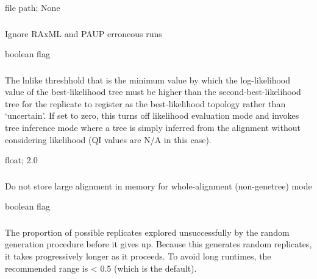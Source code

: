 \documentclass[letterpaper,12pt,english]{sphinxmanual}
\begin{document}
 file path;  None


\subsubsection{}
\label{\detokenize{prog_desc:ignore-errors}}
 Ignore RAxML and PAUP erroneous runs

 boolean flag


\subsubsection{}
\label{\detokenize{prog_desc:lnlike-lnlike-thresh}}
 The lnlike threshhold that is the minimum value by which the log-likelihood value of the best-likelihood tree must be higher than the second-best-likelihood tree for the replicate to register as the best-likelihood topology rather than ‘uncertain’. If set to zero, this turns off likelihood evaluation mode and invokes tree inference mode where a tree is simply inferred from the alignment without considering likelihood (QI values are N/A in this case).

 float;  2.0


\subsubsection{}
\label{\detokenize{prog_desc:low-mem}}
 Do not store large alignment in memory for whole-alignment (non-genetree) mode

 boolean flag


\subsubsection{}
\label{\detokenize{prog_desc:max-random-sample-proportion}}
 The proportion of possible replicates explored unsuccessfully by the random generation procedure before it gives up. Because this generates random replicates, it takes progressively longer as it proceeds. To avoid long runtimes, the recommended range is \textless{} 0.5 (which is the default).
\end{document}
